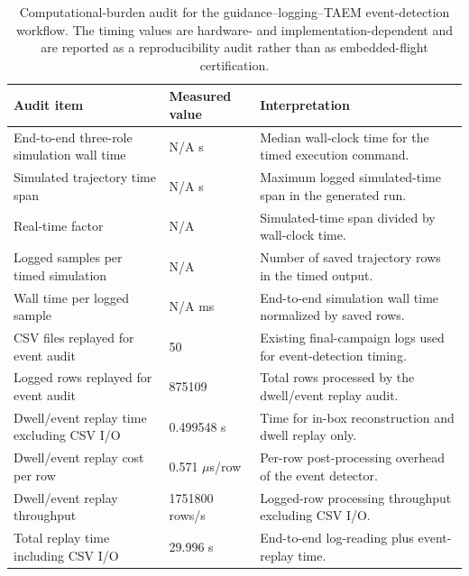 \begin{table}[pos=htbp]
\centering
\scriptsize
\caption{Computational-burden audit for the guidance--logging--TAEM event-detection workflow. The timing values are hardware- and implementation-dependent and are reported as a reproducibility audit rather than as embedded-flight certification.}
\label{tab:computational_burden_audit}
\begin{tabular}{lll}
\hline
Audit item & Measured value & Interpretation \\
\hline
End-to-end three-role simulation wall time & N/A s & Median wall-clock time for the timed execution command. \\
Simulated trajectory time span & N/A s & Maximum logged simulated-time span in the generated run. \\
Real-time factor & N/A & Simulated-time span divided by wall-clock time. \\
Logged samples per timed simulation & N/A & Number of saved trajectory rows in the timed output. \\
Wall time per logged sample & N/A ms & End-to-end simulation wall time normalized by saved rows. \\
CSV files replayed for event audit & 50 & Existing final-campaign logs used for event-detection timing. \\
Logged rows replayed for event audit & 875109 & Total rows processed by the dwell/event replay audit. \\
Dwell/event replay time excluding CSV I/O & 0.499548 s & Time for in-box reconstruction and dwell replay only. \\
Dwell/event replay cost per row & 0.571 $\mu$s/row & Per-row post-processing overhead of the event detector. \\
Dwell/event replay throughput & 1751800 rows/s & Logged-row processing throughput excluding CSV I/O. \\
Total replay time including CSV I/O & 29.996 s & End-to-end log-reading plus event-replay time. \\
\hline
\end{tabular}
\end{table}
